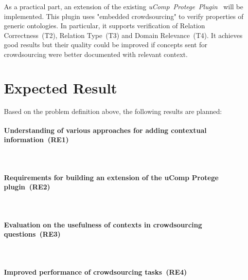 \documentclass[12pt, notitlepage]{article}
\begin{document}
As a practical part, an extension of the existing \emph{uComp~Protege~Plugin~\cite{wohlgenannt2016crowd}} will be implemented. This plugin uses "embedded crowdsourcing" to verify properties of generic ontologies. In particular, it supports verification of Relation Correctness~(T2), Relation Type~(T3) and Domain Relevance~(T4). It achieves good results but their quality could be improved if concepts sent for crowdsourcing were better documented with relevant context. 

\section{Expected Result}

Based on the problem definition above, the following results are planned:
\paragraph{Understanding of various approaches for adding contextual information~(RE1)}~

\paragraph{Requirements for building an extension of the uComp Protege plugin\cite{wohlgenannt2016crowd}~(RE2)}~

\paragraph{Evaluation on the usefulness of contexts in crowdsourcing questions~(RE3)}~

\paragraph{Improved performance of crowdsourcing tasks~(RE4)}~
\end{document}
